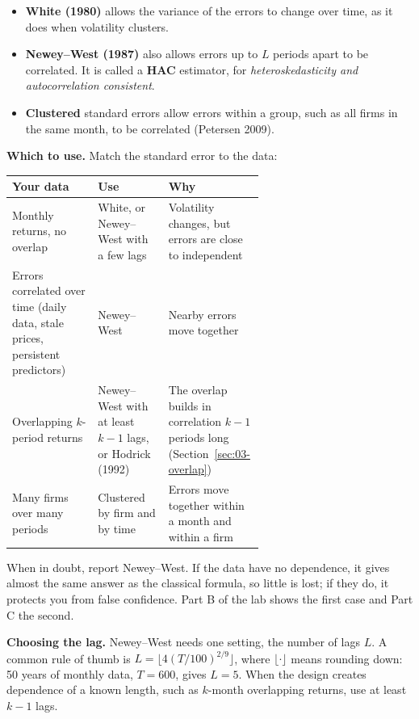 \begin{itemize}
  \item \textbf{White (1980)} allows the variance of the errors to change over
  time, as it does when volatility clusters.
  \item \textbf{Newey--West (1987)} also allows errors up to $L$ periods apart
  to be correlated. It is called a \textbf{HAC} estimator, for
  \emph{heteroskedasticity and autocorrelation consistent}.
  \item \textbf{Clustered} standard errors allow errors within a group, such as
  all firms in the same month, to be correlated (Petersen 2009).
\end{itemize}

\textbf{Which to use.} Match the standard error to the data:

\begin{center}
\small
\begin{tabularx}{0.95\linewidth}{@{}>{\raggedright\arraybackslash}p{0.34\linewidth}>{\raggedright\arraybackslash}p{0.28\linewidth}>{\raggedright\arraybackslash}X@{}}
\toprule
Your data & Use & Why \\
\midrule
Monthly returns, no overlap & White, or Newey--West with a few lags & Volatility changes, but errors are close to independent \\
Errors correlated over time (daily data, stale prices, persistent predictors) & Newey--West & Nearby errors move together \\
Overlapping $k$-period returns & Newey--West with at least $k-1$ lags, or Hodrick (1992) & The overlap builds in correlation $k-1$ periods long (Section~\ref{sec:03-overlap}) \\
Many firms over many periods & Clustered by firm and by time & Errors move together within a month and within a firm \\
\bottomrule
\end{tabularx}
\end{center}

When in doubt, report Newey--West. If the data have no dependence, it gives
almost the same answer as the classical formula, so little is lost; if they
do, it protects you from false confidence. Part B of the lab shows the first
case and Part C the second.

\textbf{Choosing the lag.} Newey--West needs one setting, the number of lags
$L$. A common rule of thumb is $L = \lfloor 4(T/100)^{2/9} \rfloor$, where
$\lfloor\cdot\rfloor$ means rounding down: 50 years of monthly data, $T = 600$,
gives $L = 5$. When the design creates dependence of a known length, such as
$k$-month overlapping returns, use at least $k - 1$ lags.

